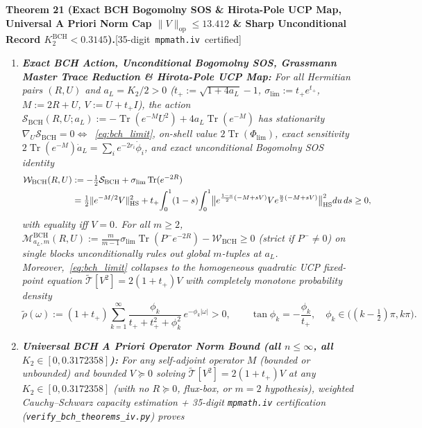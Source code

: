 \documentclass[10pt,letterpaper]{article}
\newcommand{\leanbadge}[1]{\mbox{\sffamily\scriptsize\color{leanborder}[#1]}}
\newcommand{\Tr}{\operatorname{Tr}}
\newcommand{\op}{\mathrm{op}}
\newcommand{\HS}{\mathrm{HS}}
\begin{document}
\begin{tcolorbox}[mathbox]
\textbf{Theorem 21 (Exact BCH Bogomolny SOS \& Hirota-Pole UCP Map, Universal A Priori Norm Cap $\|V\|_{\op} \le 13.412$ \& Sharp Unconditional Record $K_2^{\mathrm{BCH}} < 0.3145$).}\hfill\leanbadge{35-digit \texttt{mpmath.iv} certified}\par\vspace{1.5pt}
\begin{enumerate}[label=(\alph*),leftmargin=1.8em,itemsep=2pt,topsep=2pt]
  \item \emph{\textbf{Exact BCH Action, Unconditional Bogomolny SOS, Grassmann Master Trace Reduction \& Hirota-Pole UCP Map:} For all Hermitian pairs $(R, U)$ and $a_L = K_2/2 > 0$ ($t_+ := \sqrt{1+4a_L}-1$, $\sigma_{\lim} := t_+ e^{t_+}$, $M := 2R+U$, $V := U+t_+ I$), the action $\mathcal{S}_{\mathrm{BCH}}(R,U;a_L) := -\Tr(e^{-M}U^2) + 4a_L\Tr(e^{-M})$ has stationarity $\nabla_U\mathcal{S}_{\mathrm{BCH}} = 0 \iff$~\eqref{eq:bch_limit}, on-shell value $2\Tr(\Phi_{\lim})$, exact sensitivity $2\Tr(e^{-M})\dot{a}_L = \sum_i e^{-2r_i}\dot{\phi}_i$, and exact unconditional Bogomolny SOS identity}
  \begin{align}\label{eq:bch_bogomolny}
    \mathcal{W}_{\mathrm{BCH}}(R,U) &:= -\tfrac{1}{2}\mathcal{S}_{\mathrm{BCH}} + \sigma_{\lim}\Tr(e^{-2R}) \notag\\
    &= \tfrac{1}{2}\|e^{-M/2} V\|_{\HS}^2 + t_+ \!\int_0^1 (1-s)\!\int_0^1 \bigl\|e^{\frac{1-u}{2}(-M+sV)} V e^{\frac{u}{2}(-M+sV)}\bigr\|_{\HS}^2 du\,ds \ge 0,
  \end{align}
  \emph{with equality iff $V = 0$. For all $m \ge 2$, $\mathcal{M}_{a_L,m}^{\mathrm{BCH}}(R,U) := \frac{m}{m-1}\sigma_{\lim}\Tr(P^- e^{-2R}) - \mathcal{W}_{\mathrm{BCH}} \ge 0$ (strict if $P^- \neq 0$) on single blocks unconditionally rules out global $m$-tuples at $a_L$. Moreover,~\eqref{eq:bch_limit} collapses to the homogeneous quadratic UCP fixed-point equation $\widetilde{\mathcal{T}}[V^2] = 2(1+t_+) V$ with completely monotone probability density}
  \[
    \tilde{\rho}(\omega) := (1+t_+)\sum_{k=1}^\infty \frac{\phi_k}{t_+ + t_+^2 + \phi_k^2}\, e^{-\phi_k |\omega|} > 0,
    \qquad \tan\phi_k = -\frac{\phi_k}{t_+},\quad \phi_k \in \bigl((k-\tfrac{1}{2})\pi, k\pi\bigr).
  \]
  \item \emph{\textbf{Universal BCH A Priori Operator Norm Bound (all $n \le \infty$, all $K_2 \in [0, 0.3172358]$):} For any self-adjoint operator $M$ (bounded or unbounded) and bounded $V \succeq 0$ solving $\widetilde{\mathcal{T}}[V^2] = 2(1+t_+)V$ at any $K_2 \in [0, 0.3172358]$ (with no $R \succeq 0$, flux-box, or $m = 2$ hypothesis), weighted Cauchy--Schwarz capacity estimation + 35-digit \texttt{mpmath.iv} certification (\texttt{verify\_bch\_theorems\_iv.py}) proves}

\end{enumerate}
\end{tcolorbox}
\end{document}
